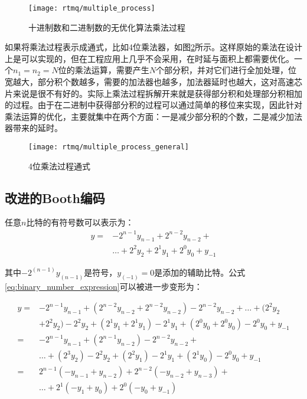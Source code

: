 \begin{figure}
    \centering
    \caption[十进制数和二进制数的无优化算法乘法过程]{十进制数和二进制数的无优化算法乘法过程\label{fig:multiple_process}}
    \texttt{[image: rtmq/multiple\_process]}
\end{figure}

如果将乘法过程表示成通式，比如4位乘法器，如图\ref{fig:multiple_process_general}所示。这样原始的乘法在设计上是可以实现的，但在工程应用上几乎不会采用，在时延与面积上都需要优化。一个$n_1=n_2=N$位的乘法运算，需要产生$N$个部分积，并对它们进行全加处理，位宽越大，部分积个数越多，需要的加法器也越多，加法器延时也越大，这对高速芯片来说是很不有好的。实际上乘法过程拆解开来就是获得部分积和处理部分积相加的过程。由于在二进制中获得部分积的过程可以通过简单的移位来实现，因此针对乘法运算的优化，主要就集中在两个方面：一是减少部分积的个数，二是减少加法器带来的延时。

\begin{figure}
    \centering
    \caption[4位乘法过程通式]{4位乘法过程通式\label{fig:multiple_process_general}}
    \texttt{[image: rtmq/multiple\_process\_general]}
\end{figure}

\subsection[改进的Booth编码]{改进的Booth编码}

任意$n$比特的有符号数可以表示为：
\begin{align}
    y=&-2^{n-1} y_{n-1}+2^{n-2} y_{n-2}+\\
    &…+2^2 y_2+2^1 y_1+2^0 y_0+y_{-1}\label{eq:binary_number_expression}
\end{align}

其中$-2^(n-1) y_(n-1)$是符号，$y_(-1)=0$是添加的辅助比特。公式\ref{eq:binary_number_expression}可以被进一步变形为：

\begin{align}
    y=&-2^{n-1} y_{n-1}+(2^{n-2} y_{n-2}+2^{n-2} y_{n-2} )-2^{n-2} y_{n-2}+…+(2^2 y_2\\
    &+2^2 y_2 )-2^2 y_2+(2^1 y_1+2^1 y_1 )-2^1 y_1+(2^0 y_0+2^0 y_0 )-2^0 y_0+y_{-1}\\
    =&-2^{n-1} y_{n-1}+(2^{n-1} y_{n-2} )-2^{n-2} y_{n-2}+\\
    &…+(2^3 y_2 )−2^2 y_2+(2^2 y_1 )-2^1 y_1+(2^1 y_0 )-2^0 y_0+y_{-1}\\
    =&2^{n-1} (-y_{n-1}+y_{n-2} )+2^{n-2} (-y_{n-2}+y_{n-3} )+\\
    &…+2^1 (-y_1+y_0 )+2^0 (-y_0+y_{-1})\label{eq:binary_number_expression1}
\end{align}

